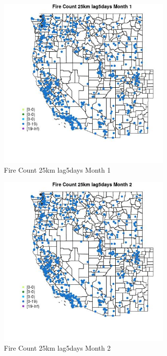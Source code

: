 \begin{figure} 
\centering  
\includegraphics[width=0.77\textwidth]{Code_Outputs/Report_ML_input_PM25_Step4_part_e_de_duplicated_aves_compiled_2019-05-21wNAs_MapObsMo1Fire_Count_25km_lag5days.jpg} 
\caption{\label{fig:Report_ML_input_PM25_Step4_part_e_de_duplicated_aves_compiled_2019-05-21wNAsMapObsMo1Fire_Count_25km_lag5days}Fire Count 25km lag5days Month 1} 
\end{figure} 
 

\begin{figure} 
\centering  
\includegraphics[width=0.77\textwidth]{Code_Outputs/Report_ML_input_PM25_Step4_part_e_de_duplicated_aves_compiled_2019-05-21wNAs_MapObsMo2Fire_Count_25km_lag5days.jpg} 
\caption{\label{fig:Report_ML_input_PM25_Step4_part_e_de_duplicated_aves_compiled_2019-05-21wNAsMapObsMo2Fire_Count_25km_lag5days}Fire Count 25km lag5days Month 2} 
\end{figure} 
 

